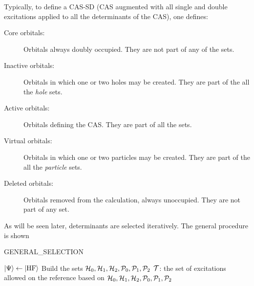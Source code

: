 \documentclass[./thesis.tex]{subfiles}
\begin{document}
Typically, to define a CAS-SD (CAS augmented with all single and double excitations applied to all the determinants of the CAS), one defines:
\begin{description}
\item [Core orbitals:]
Orbitals always doubly occupied. They are not part of any of the sets.
\item [Inactive orbitals:]
Orbitals in which one or two holes may be created. They are part of the all the \emph{hole} sets.
\item [Active orbitals:]
Orbitals defining the CAS. They are part of all the sets.
\item [Virtual orbitals:]
Orbitals in which one or two particles may be created. They are part of the all the \emph{particle} sets.
\item [Deleted orbitals:]
Orbitals removed from the calculation, always unoccupied. They are not part of any set.
\end{description}


 As will be seen later, determinants are selected iteratively. The general procedure is shown 



\begin{algorithm}
	\caption{GENERAL\_SELECTION}	
	\label{alg:GENERAL_SELECTION}	
	$\ket{\Psi} \gets \ket{{\text{HF}}}$\;
	Build the sets ${\mathcal{H}}_0, {\mathcal{H}}_1, {\mathcal{H}}_2, {\mathcal{P}}_0, {\mathcal{P}}_1, {\mathcal{P}}_2$ \;
	${\mathcal{T}}$: the set of excitations allowed on the reference based on ${\mathcal{H}}_0, {\mathcal{H}}_1, {\mathcal{H}}_2, {\mathcal{P}}_0, {\mathcal{P}}_1, {\mathcal{P}}_2$ \;
	
\end{algorithm}
\end{document}
